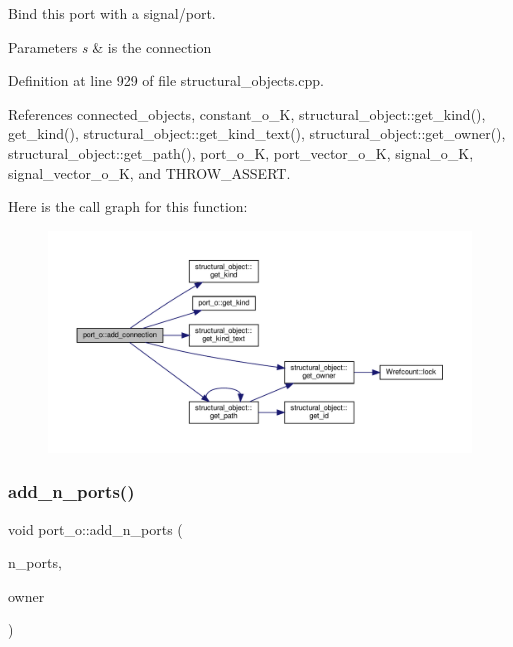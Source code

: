 Bind this port with a signal/port. 


\begin{DoxyParams}{Parameters}
{\em s} & is the connection \\
\hline
\end{DoxyParams}


Definition at line 929 of file structural\+\_\+objects.\+cpp.



References connected\+\_\+objects, constant\+\_\+o\+\_\+K, structural\+\_\+object\+::get\+\_\+kind(), get\+\_\+kind(), structural\+\_\+object\+::get\+\_\+kind\+\_\+text(), structural\+\_\+object\+::get\+\_\+owner(), structural\+\_\+object\+::get\+\_\+path(), port\+\_\+o\+\_\+K, port\+\_\+vector\+\_\+o\+\_\+K, signal\+\_\+o\+\_\+K, signal\+\_\+vector\+\_\+o\+\_\+K, and T\+H\+R\+O\+W\+\_\+\+A\+S\+S\+E\+RT.

Here is the call graph for this function\+:
\nopagebreak
\begin{figure}[H]
\begin{center}
\leavevmode
\includegraphics[width=350pt]{df/d75/structport__o_a9f9966ea1f2df677fd3985149eb2393e_cgraph}
\end{center}
\end{figure}
\mbox{\label{structport__o_adf5180258c79071f73582bf9427a8f06}} 
\subsubsection{\texorpdfstring{add\+\_\+n\+\_\+ports()}{add\_n\_ports()}}
{\footnotesize\ttfamily void port\+\_\+o\+::add\+\_\+n\+\_\+ports (\begin{DoxyParamCaption}\item[{unsigned int}]{n\+\_\+ports,  }\item[{\hyperlink{structural__objects_8hpp_a8ea5f8cc50ab8f4c31e2751074ff60b2}{structural\+\_\+object\+Ref}}]{owner }\end{DoxyParamCaption})}



